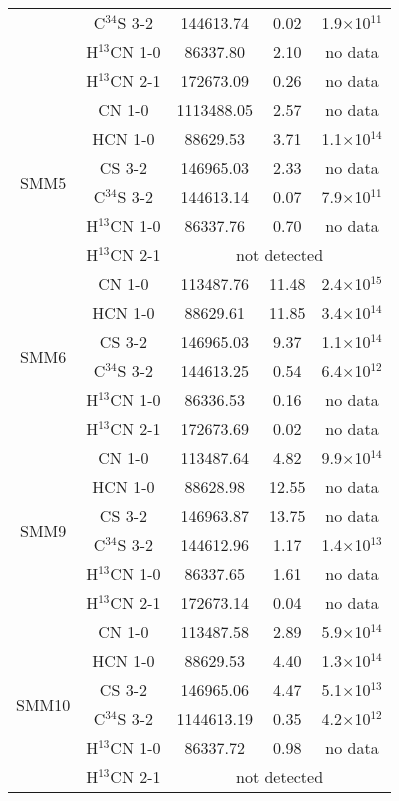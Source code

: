 \documentclass{aa}
\begin{document}
\begin{table}
\begin{tabular}{c c c c c}
{} & C$^{34}$S 3-2 & 144613.74 & 0.02 & 1.9$\times$10$^{11}$\\ 
{} & H$^{13}$CN 1-0 & 86337.80 & 2.10 & no data\\ 
{} & H$^{13}$CN 2-1 & 172673.09 & 0.26 & no data\\  \hline
\multirow{6}{*}{SMM5} & CN 1-0 & 1113488.05 & 2.57 & no data\\
{} & HCN 1-0 & 88629.53 & 3.71 & 1.1$\times$10$^{14}$\\ 
{} & CS 3-2 & 146965.03 & 2.33 & no data\\  
{} & C$^{34}$S 3-2 & 144613.14 & 0.07 & 7.9$\times$10$^{11}$\\ 
{} & H$^{13}$CN 1-0 & 86337.76 & 0.70 & no data\\ 
{} & H$^{13}$CN 2-1 & \multicolumn{3}{c}{not detected}  \\  \hline
\multirow{6}{*}{SMM6} & CN 1-0 & 113487.76 & 11.48 & 2.4$\times$10$^{15}$\\
{} & HCN 1-0 & 88629.61 & 11.85 & 3.4$\times$10$^{14}$ \\ 
{} & CS 3-2 & 146965.03 & 9.37 & 1.1$\times$10$^{14}$ \\  
{} & C$^{34}$S 3-2 & 144613.25 & 0.54 & 6.4$\times$10$^{12}$ \\ 
{} & H$^{13}$CN 1-0 & 86336.53 & 0.16 & no data\\
{} & H$^{13}$CN 2-1 & 172673.69 & 0.02 & no data \\  \hline
\multirow{6}{*}{SMM9} & CN 1-0 & 113487.64 & 4.82 & 9.9$\times$10$^{14}$\\
{} & HCN 1-0 & 88628.98 & 12.55 & no data \\ 
{} & CS 3-2 & 146963.87 & 13.75 & no data\\ 
{} & C$^{34}$S 3-2 & 144612.96 & 1.17 & 1.4$\times$10$^{13}$ \\ 
{} & H$^{13}$CN 1-0 & 86337.65 & 1.61 & no data\\ 
{} & H$^{13}$CN 2-1 & 172673.14 & 0.04 & no data\\  \hline
\multirow{6}{*}{SMM10} & CN 1-0 & 113487.58 & 2.89 & 5.9$\times$10$^{14}$\\
{} & HCN 1-0 & 88629.53 & 4.40 & 1.3$\times$10$^{14}$\\ 
{} & CS 3-2 & 146965.06 & 4.47 & 5.1$\times$10$^{13}$ \\  
{} & C$^{34}$S 3-2 & 1144613.19 & 0.35 & 4.2$\times$10$^{12}$\\ 
{} & H$^{13}$CN 1-0 & 86337.72 & 0.98 & no data\\ 
{} & H$^{13}$CN 2-1 & \multicolumn{3}{c}{not detected}  \\  \hline

\end{tabular}
\end{table}
\end{document}
